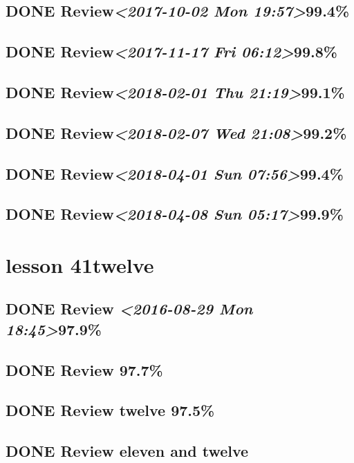 \documentclass[11pt]{ctexart}
\begin{document}
\subsection{{\bfseries\sffamily DONE} Review\textit{<2017-10-02 Mon 19:57>}99.4\%}
\label{sec:org520fd6d}

\subsection{{\bfseries\sffamily DONE} Review\textit{<2017-11-17 Fri 06:12>}99.8\%}
\label{sec:org5152797}
\subsection{{\bfseries\sffamily DONE} Review\textit{<2018-02-01 Thu 21:19>}99.1\%}
\label{sec:org05e299a}
\subsection{{\bfseries\sffamily DONE} Review\textit{<2018-02-07 Wed 21:08>}99.2\%}
\label{sec:orge788121}
\subsection{{\bfseries\sffamily DONE} Review\textit{<2018-04-01 Sun 07:56>}99.4\%}
\label{sec:orgc6513c3}
\subsection{{\bfseries\sffamily DONE} Review\textit{<2018-04-08 Sun 05:17>}99.9\%}
\label{sec:orgf4ce947}
\section{lesson 41twelve}
\label{sec:orge4cbd42}
\subsection{{\bfseries\sffamily DONE} Review \textit{<2016-08-29 Mon 18:45>}97.9\%}
\label{sec:orgfa6b7f0}
\subsection{{\bfseries\sffamily DONE} Review 97.7\%}
\label{sec:orgbd0244d}
\subsection{{\bfseries\sffamily DONE} Review twelve 97.5\%}
\label{sec:org01aec9c}
\subsection{{\bfseries\sffamily DONE} Review eleven and twelve}
\label{sec:orgf7ab3e1}
\end{document}
